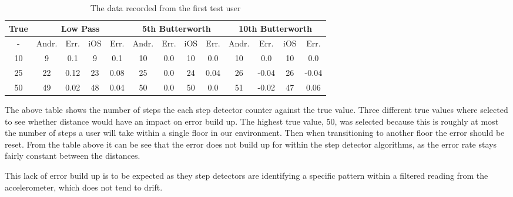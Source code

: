 \documentclass[main.tex]{subfiles}
\begin{document}


\begin{table}[ht]
	\begin{tabular}{| c || c | c | c | c | c | c | c | c | c | c | c | c |}
		\hline
		True & \multicolumn{4}{c}{Low Pass} & \multicolumn{4}{|c|}{5th Butterworth} & \multicolumn{4}{c|}{10th Butterworth} \\
		\hline
		 - & Andr. & Err. & iOS & Err. & Andr. & Err. & iOS & Err. & Andr. & Err. & iOS & Err.\\
		\hline
		10 & 9 & 0.1 & 9 & 0.1 & 10 & 0.0 & 10 & 0.0 & 10 & 0.0 & 10 & 0.0 \\ 		
		25 & 22 & 0.12 & 23 & 0.08 & 25 & 0.0 & 24 & 0.04 & 26 & -0.04 & 26 & -0.04 \\ 	
		50 & 49 & 0.02 & 48 & 0.04 & 50 & 0.0 & 50 & 0.0 & 51 & -0.02 & 47 & 0.06\\ 
		\hline	
	\end{tabular}
	\caption{The data recorded from the first test user}
\end{table}

The above table shows the number of steps the each step detector counter against the true value. Three different true values where selected to see whether distance would have an impact on error build up. The highest true value, 50, was selected because this is roughly at most the number of steps a user will take within a single floor in our environment. Then when transitioning to another floor the error should be reset. From the table above it can be see that the error does not build up for within the step detector algorithms, as the error rate stays fairly constant between the distances. 

This lack of error build up is to be expected as they step detectors are identifying a specific pattern within a filtered reading from the accelerometer, which does not tend to drift.
\end{document}
